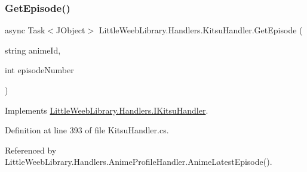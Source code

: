 \subsubsection{\texorpdfstring{Get\+Episode()}{GetEpisode()}}
{\footnotesize\ttfamily async Task$<$J\+Object$>$ Little\+Weeb\+Library.\+Handlers.\+Kitsu\+Handler.\+Get\+Episode (\begin{DoxyParamCaption}\item[{string}]{anime\+Id,  }\item[{int}]{episode\+Number }\end{DoxyParamCaption})}



Implements \mbox{\hyperlink{interface_little_weeb_library_1_1_handlers_1_1_i_kitsu_handler_a9f182eabb098e98f566c8add1695bb36}{Little\+Weeb\+Library.\+Handlers.\+I\+Kitsu\+Handler}}.



Definition at line 393 of file Kitsu\+Handler.\+cs.



Referenced by Little\+Weeb\+Library.\+Handlers.\+Anime\+Profile\+Handler.\+Anime\+Latest\+Episode().


